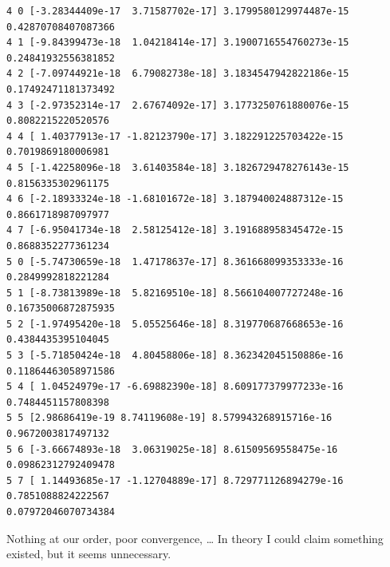 \documentclass[11pt]{article}
\begin{document}
\begin{Verbatim}[commandchars=\\\{\}]
4 0 [-3.28344409e-17  3.71587702e-17] 3.1799580129974487e-15 0.42870708407087366
4 1 [-9.84399473e-18  1.04218414e-17] 3.1900716554760273e-15 0.24841932556381852
4 2 [-7.09744921e-18  6.79082738e-18] 3.1834547942822186e-15 0.17492471181373492
4 3 [-2.97352314e-17  2.67674092e-17] 3.1773250761880076e-15 0.8082215220520576
4 4 [ 1.40377913e-17 -1.82123790e-17] 3.182291225703422e-15 0.7019869180006981
4 5 [-1.42258096e-18  3.61403584e-18] 3.1826729478276143e-15 0.8156335302961175
4 6 [-2.18933324e-18 -1.68101672e-18] 3.187940024887312e-15 0.8661718987097977
4 7 [-6.95041734e-18  2.58125412e-18] 3.191688958345472e-15 0.8688352277361234
5 0 [-5.74730659e-18  1.47178637e-17] 8.361668099353333e-16 0.2849992818221284
5 1 [-8.73813989e-18  5.82169510e-18] 8.566104007727248e-16 0.16735006872875935
5 2 [-1.97495420e-18  5.05525646e-18] 8.319770687668653e-16 0.4384435395104045
5 3 [-5.71850424e-18  4.80458806e-18] 8.362342045150886e-16 0.11864463058971586
5 4 [ 1.04524979e-17 -6.69882390e-18] 8.609177379977233e-16 0.7484451157808398
5 5 [2.98686419e-19 8.74119608e-19] 8.579943268915716e-16 0.9672003817497132
5 6 [-3.66674893e-18  3.06319025e-18] 8.61509569558475e-16 0.09862312792409478
5 7 [ 1.14493685e-17 -1.12704889e-17] 8.729771126894279e-16 0.7851088824222567
0.07972046070734384
    \end{Verbatim}

    Nothing at our order, poor convergence, \ldots{} In theory I could claim
something existed, but it seems unnecessary.
\end{document}
